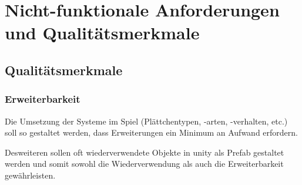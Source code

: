 \documentclass[../main.tex]{subfiles}
\begin{document}
	\section{Nicht-funktionale Anforderungen und Qualitätsmerkmale}
	\label{section:NonFunctionalRequirements}
	\subsection{Qualitätsmerkmale}
	\subsubsection{Erweiterbarkeit}
	\par Die Umsetzung der Systeme im Spiel (Plättchentypen, -arten, -verhalten, etc.) soll so gestaltet werden, dass Erweiterungen ein Minimum an Aufwand erfordern.
	\par Desweiteren sollen oft wiederverwendete Objekte in \gls{unity} als Prefab gestaltet werden und somit sowohl die Wiederverwendung als auch die Erweiterbarkeit gewährleisten. 
	
\end{document}
